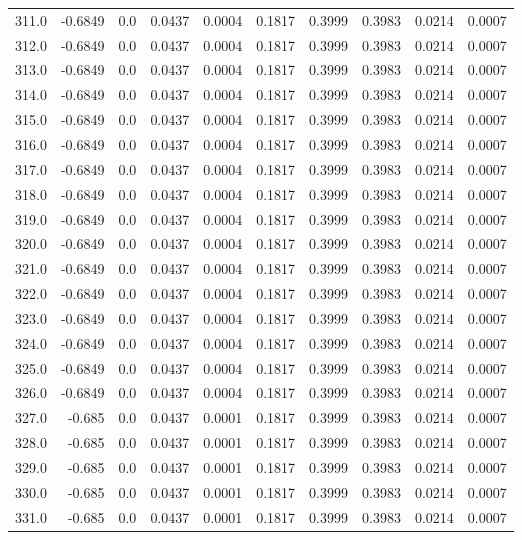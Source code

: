 \begin{longtable}{lrrrrrrrrr}
311.0 & -0.6849 & 0.0 & 0.0437 & 0.0004 & 0.1817 & 0.3999 & 0.3983 & 0.0214 & 0.0007 \\
312.0 & -0.6849 & 0.0 & 0.0437 & 0.0004 & 0.1817 & 0.3999 & 0.3983 & 0.0214 & 0.0007 \\
313.0 & -0.6849 & 0.0 & 0.0437 & 0.0004 & 0.1817 & 0.3999 & 0.3983 & 0.0214 & 0.0007 \\
314.0 & -0.6849 & 0.0 & 0.0437 & 0.0004 & 0.1817 & 0.3999 & 0.3983 & 0.0214 & 0.0007 \\
315.0 & -0.6849 & 0.0 & 0.0437 & 0.0004 & 0.1817 & 0.3999 & 0.3983 & 0.0214 & 0.0007 \\
316.0 & -0.6849 & 0.0 & 0.0437 & 0.0004 & 0.1817 & 0.3999 & 0.3983 & 0.0214 & 0.0007 \\
317.0 & -0.6849 & 0.0 & 0.0437 & 0.0004 & 0.1817 & 0.3999 & 0.3983 & 0.0214 & 0.0007 \\
318.0 & -0.6849 & 0.0 & 0.0437 & 0.0004 & 0.1817 & 0.3999 & 0.3983 & 0.0214 & 0.0007 \\
319.0 & -0.6849 & 0.0 & 0.0437 & 0.0004 & 0.1817 & 0.3999 & 0.3983 & 0.0214 & 0.0007 \\
320.0 & -0.6849 & 0.0 & 0.0437 & 0.0004 & 0.1817 & 0.3999 & 0.3983 & 0.0214 & 0.0007 \\
321.0 & -0.6849 & 0.0 & 0.0437 & 0.0004 & 0.1817 & 0.3999 & 0.3983 & 0.0214 & 0.0007 \\
322.0 & -0.6849 & 0.0 & 0.0437 & 0.0004 & 0.1817 & 0.3999 & 0.3983 & 0.0214 & 0.0007 \\
323.0 & -0.6849 & 0.0 & 0.0437 & 0.0004 & 0.1817 & 0.3999 & 0.3983 & 0.0214 & 0.0007 \\
324.0 & -0.6849 & 0.0 & 0.0437 & 0.0004 & 0.1817 & 0.3999 & 0.3983 & 0.0214 & 0.0007 \\
325.0 & -0.6849 & 0.0 & 0.0437 & 0.0004 & 0.1817 & 0.3999 & 0.3983 & 0.0214 & 0.0007 \\
326.0 & -0.6849 & 0.0 & 0.0437 & 0.0004 & 0.1817 & 0.3999 & 0.3983 & 0.0214 & 0.0007 \\
327.0 & -0.685 & 0.0 & 0.0437 & 0.0001 & 0.1817 & 0.3999 & 0.3983 & 0.0214 & 0.0007 \\
328.0 & -0.685 & 0.0 & 0.0437 & 0.0001 & 0.1817 & 0.3999 & 0.3983 & 0.0214 & 0.0007 \\
329.0 & -0.685 & 0.0 & 0.0437 & 0.0001 & 0.1817 & 0.3999 & 0.3983 & 0.0214 & 0.0007 \\
330.0 & -0.685 & 0.0 & 0.0437 & 0.0001 & 0.1817 & 0.3999 & 0.3983 & 0.0214 & 0.0007 \\
331.0 & -0.685 & 0.0 & 0.0437 & 0.0001 & 0.1817 & 0.3999 & 0.3983 & 0.0214 & 0.0007 \\

\end{longtable}
